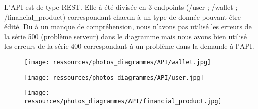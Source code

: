 \documentclass[../rapport.tex]{subfiles}
\begin{document}
L'API est de type REST. Elle à été divisée en 3 endpoints (/user ; /wallet ; /financial\_product) correspondant chacun à un type de donnée pouvant être édité. 
Du à un manque de compréhension, nous n'avons pas utilisé les erreurs de la série 500 (problème serveur) dans le diagramme mais nous avons bien utilisé les erreurs de la série 400 correspondant à un problème dans la demande à l'API.

\begin{figure}[H]
    \texttt{[image: ressources/photos\_diagrammes/API/wallet.jpg]}
\end{figure}

\begin{figure}[H]
    \texttt{[image: ressources/photos\_diagrammes/API/user.jpg]}
\end{figure}

\begin{figure}[H]
    \texttt{[image: ressources/photos\_diagrammes/API/financial\_product.jpg]}
\end{figure}

\newpage
\end{document}

